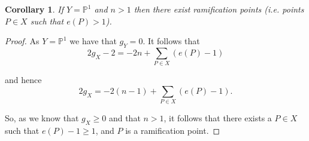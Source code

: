 \documentclass[11pt]{article} %
\newtheorem{cor}{Corollary}
\begin{document}
\begin{cor}
	If $Y=\mathbb{P}^{1}$ and $n>1$ then there exist ramification points (i.e. points  $P\in X$ such that 				$e(P)>1$).
\end{cor}

\begin{proof}
	As $Y=\mathbb{P}^{1}$ we have that $g_{Y}=0$. It follows that 
		\begin{equation*}
			2g_{X}-2=-2n+\sum_{P\in X}(e(P)-1)
		\end{equation*}
	
	 and hence
		\begin{equation*}
			2g_{X}=-2(n-1)+\sum_{P\in X} (e(P)-1).
		\end{equation*}

	So, as we know that $g_{X}\geq 0$ and that $n>1$, it follows that there exists a $P\in X$ such that 				$e(P)-1\geq 1$, and $P$ is a ramification point.
\end{proof}
\end{document}
